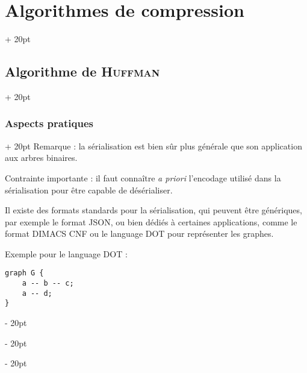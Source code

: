 \documentclass[a4paper, 12pt, twoside]{article}
\newcommand{\ind}[1][20pt]{\advance\leftskip + #1}
\newcommand{\deind}[1][20pt]{\advance\leftskip - #1}
\newenvironment{indt}[2][20pt]{#2 \par \ind[#1]}{\par \deind} %
\begin{document}
\begin{indt}{\section{Algorithmes de compression}}
\begin{indt}{\subsection{Algorithme de \textsc{Huffman}}}
\begin{indt}{\subsubsection{Aspects pratiques}}
                Remarque : la sérialisation est bien sûr plus générale que son application aux arbres binaires.

                Contrainte importante : il faut connaître \textit{a priori} l'encodage utilisé dans la sérialisation pour être capable de désérialiser.

                Il existe des formats standards pour la sérialisation, qui peuvent être génériques, par exemple le format JSON, ou bien dédiés à certaines applications, comme le format DIMACS CNF ou le language DOT pour représenter les graphes.

                Exemple pour le language DOT :

                \begin{lstlisting}[xleftmargin=80pt]
graph G {
    a -- b -- c;
    a -- d;
}\end{lstlisting}
                
                \begin{center}
                \end{center}
            \end{indt}
        \end{indt}
    \end{indt}
    
    
    
\end{document}
